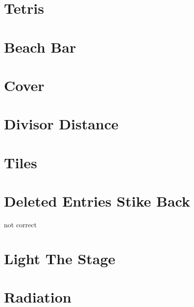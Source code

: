 \documentclass[a4paper, 10pt]{article}
\let\stdsection\section
\renewcommand\section{\newpage\stdsection}
\newcommand{\includecode}[1]{
    }
\newcommand{\algoAuthor}{2} %
\begin{document}
    \section{Tetris}
        \label{sec:tetris}
        \includecode{../problems/w10/Tetris/Tetris\algoAuthor.cpp}
 
    
    \section{Beach Bar}
        \label{sec:beach_bar}
        \includecode{../problems/w11/Beach_Bar/BeachBar\algoAuthor.cpp}
        
    \section{Cover}
        \label{sec:cover}
        \includecode{../problems/w11/Cover/Cover\algoAuthor.cpp}
        
    \section{Divisor Distance}
        \label{sec:divisor_distance}
        \includecode{../problems/w11/Divisor_Distance/DivisorDistance\algoAuthor.cpp}
        
    \section{Tiles}
        \label{sec:tiles}
        \includecode{../problems/w11/Tiles/Tiles\algoAuthor.cpp}
        
    
    \section{Deleted Entries Stike Back}
        \label{sec:deleted_entries_strike_back}
        not correct
        \includecode{../problems/w12/Deleted_Entries_Strike_Back/DeletedEntriesStrikeBack\algoAuthor.cpp}
        
    \section{Light The Stage}
        \label{sec:light_the_stage}
        \includecode{../problems/w12/Light_The_Stage/LightTheStage\algoAuthor.cpp}
        
    \section{Radiation}
        \label{sec:radiation}
        \includecode{../problems/w12/Radiation/Radiation\algoAuthor.cpp}
        
\end{document}
